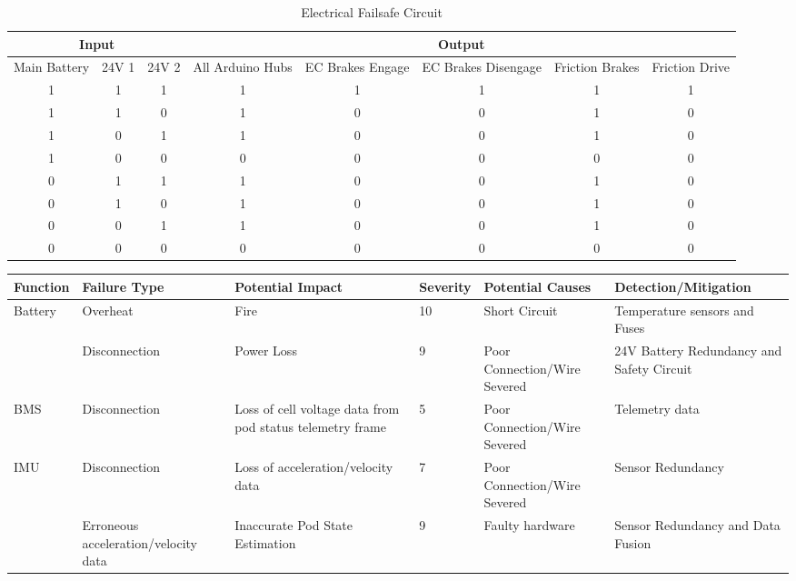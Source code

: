 \documentclass[hidelinks, twoside]{report}
\begin{document}
\begin{appendices}
\begin{table}[]
\centering
\caption{Electrical Failsafe Circuit}
\label{my-label}
\begin{tabular}{ccc|ccccc}
\hline
\multicolumn{3}{c}{Input}     & \multicolumn{5}{c}{Output} \\ \hline
Main Battery & 24V 1 & 24V 2   & All Arduino Hubs & EC Brakes Engage & EC Brakes Disengage & Friction Brakes & Friction Drive \\ \hline
1            & 1     & 1       & 1                & 1 & 1         & 1               & 1              \\
1            & 1     & 0       & 1                & 0 & 0        & 1               & 0              \\
1            & 0     & 1       & 1                & 0 & 0        & 1               & 0              \\
1            & 0     & 0       & 0                & 0 & 0        & 0               & 0              \\
0            & 1     & 1       & 1                & 0 & 0        & 1               & 0              \\
0            & 1     & 0       & 1                & 0 & 0        & 1               & 0              \\
0            & 0     & 1       & 1                & 0 & 0        & 1               & 0              \\
0            & 0     & 0       & 0                & 0 & 0        & 0               & 0              \\ \hline
\end{tabular}
\end{table}

\begin{table}
\centering
  \begin{tabular}{@{}p{2cm}p{2cm}p{3cm}p{1cm}p{3cm}p{3cm}@{}} \toprule
    Function & Failure Type & Potential Impact & Severity & Potential Causes & Detection/Mitigation \\ \midrule
    \multirow{2}{*}{Battery} & Overheat & Fire & 10 & Short Circuit & Temperature sensors and Fuses \\
    & Disconnection & Power Loss & 9 & Poor Connection/Wire Severed & 24V Battery Redundancy and Safety Circuit \\
    BMS & Disconnection & Loss of cell voltage data from pod status telemetry frame & 5 & Poor Connection/Wire Severed & Telemetry data \\
    \multirow{2}{*}{IMU} & Disconnection & Loss of acceleration/velocity data & 7 & Poor Connection/Wire Severed & Sensor Redundancy \\
    & Erroneous acceleration/velocity data & Inaccurate Pod State Estimation & 9 & Faulty hardware & Sensor Redundancy and Data Fusion \\



\end{tabular}
\end{table}
\end{appendices}
\end{document}

